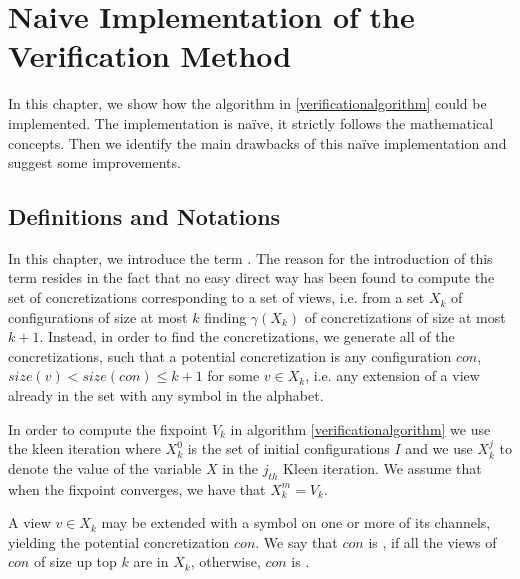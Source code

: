 \section{Naive Implementation of the Verification Method}
\label{naive}
In this chapter, we show how the algorithm in \ref{verificationalgorithm} could be implemented. The implementation is naïve, it strictly follows the mathematical concepts. Then we identify the main drawbacks of this naïve implementation and suggest some improvements.

\subsection{Definitions and Notations}
In this chapter, we introduce the term . The reason for the introduction of this term resides in the fact that no easy direct way has been found to compute the set of concretizations corresponding to a set of views, i.e. from a set $X_k$ of configurations of size at most $k$ finding $\gamma(X_k)$ of concretizations of size at most $k+1$. Instead, in order to find the concretizations, we generate all of the  concretizations, such that a potential concretization is any configuration $con$, $size(v) < size(con) \leq k+1$ for some $v \in X_k$, i.e. any extension of a view already in the set with any symbol in the alphabet.

In order to compute the fixpoint $V_k$ in algorithm \ref{verificationalgorithm} we use the kleen iteration where $X_k^0$ is the set of initial configurations $I$ and we use $X_k^j$ to denote the value of the variable $X$ in the $j_{th}$ Kleen iteration. We assume that when the fixpoint converges, we have that $X_k^m=V_k$.

 
A view $v\in X_k$ may be extended with a symbol on one or more of its channels, yielding the potential concretization $con$. We say that $con$ is , if all the views of $con$ of size up top $k$ are in $X_k$, otherwise, $con$ is . 

